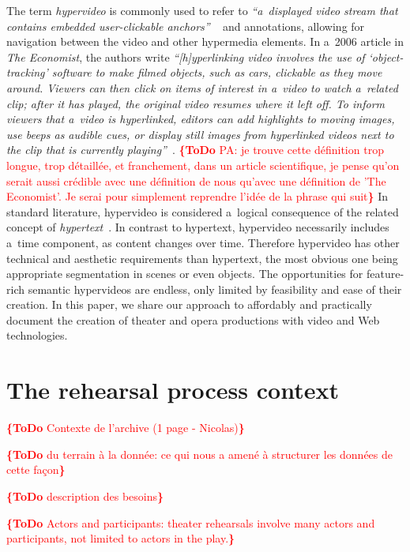 \documentclass[conference]{IEEEtran}
\newcommand{\todo}[1]{\noindent\textcolor{red}{{\bf \{ToDo} #1{\bf \}}}}
\begin{document}
The term \emph{hypervideo} is commonly used to refer to
\textit{``a~displayed video stream that contains embedded user-clickable anchors''}%
~\cite{sawhney1996hypercafe,smith2002extensible}
and annotations, allowing for navigation between the video and other hypermedia elements.
In a~2006 article in \emph{The Economist}, the authors write 
\textit{``[h]yperlinking video involves the use of `object-tracking' software
to make filmed objects, such as cars, clickable as they move around.
Viewers can then click on items of interest in a~video
to watch a~related clip; after it has played,
the original video resumes where it left off.
To inform viewers that a~video is hyperlinked,
editors can add highlights to moving images, use beeps as audible cues,
or display still images from hyperlinked videos
next to the clip that is currently playing''}~\cite{economist2006hypervideo}.
\todo{PA: je trouve cette définition trop longue, trop détaillée, et franchement, dans un article scientifique, je pense qu'on serait aussi crédible avec une définition de nous qu'avec une définition de 'The Economist'. Je serai pour simplement reprendre l'idée de la phrase qui suit}
In standard literature, hypervideo is considered a~logical consequence
of the related concept of \emph{hypertext}~\cite{bernerslee1990hypertext}.
In contrast to hypertext, hypervideo necessarily includes a~time component,
as content changes over time.
Therefore hypervideo has other technical and aesthetic requirements
than hypertext, the most obvious one being appropriate segmentation in scenes
or even objects.
The opportunities for feature-rich semantic hypervideos are endless,
only limited by feasibility and ease of their creation.
In this paper, we share our approach to affordably and practically document
the creation of theater and opera productions with video and Web technologies.


\section{The rehearsal process context}
\label{sec:context}

\todo{Contexte de l'archive (1 page - Nicolas)}

\todo{du terrain à la donnée: ce qui nous a amené à structurer les données de cette façon}

\todo{description des besoins}

\todo{Actors and participants:  theater rehearsals involve many actors and participants, not limited to actors in the play.}
\end{document}
